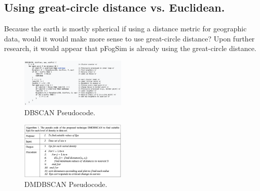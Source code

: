 \documentclass[letterpaper,twocolumn,10pt]{article}
\begin{document}
\subsection{Using great-circle distance vs. Euclidean.}Because the earth is mostly spherical if using a distance metric for geographic data, would it would make more sense to use great-circle distance? Upon further research, it would appear that pFogSim is already using the great-circle distance.

\begin{figure}[h]
\centering
\includegraphics[width=0.45\textwidth]{pseudocode}
\caption{\label{fig:pseudocode}DBSCAN Pseudocode.}
\end{figure}

\begin{figure}[h]
\centering
\includegraphics[width=0.45\textwidth]{dmdbscan}
\caption{\label{fig:dmdbscan}DMDBSCAN Pseudocode.}
\end{figure}



\end{document}
